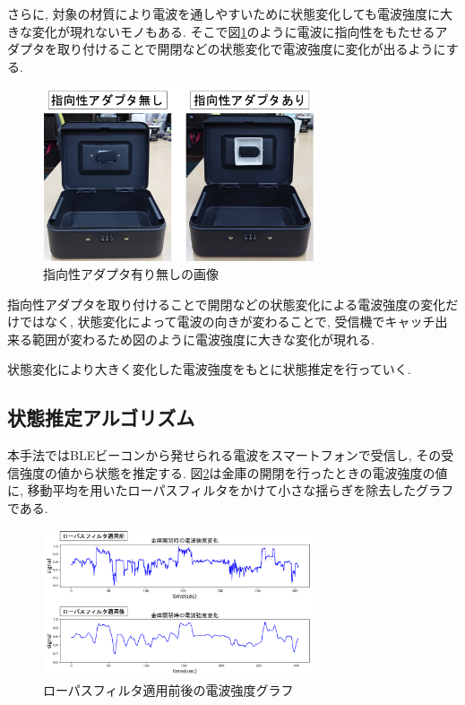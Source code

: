 \documentclass[Japanese]{dicomopapers}
\begin{document}
さらに, 対象の材質により電波を通しやすいために状態変化しても電波強度に大きな変化が現れないモノもある.
そこで図\ref{adapter}のように電波に指向性をもたせるアダプタを取り付けることで開閉などの状態変化で電波強度に変化が出るようにする.


\begin{figure}[ht]
 \centering
 \includegraphics[width=8cm]{adapta_compare.png}
 \caption{指向性アダプタ有り無しの画像}
 \label{adapter}
\end{figure}

指向性アダプタを取り付けることで開閉などの状態変化による電波強度の変化だけではなく, 状態変化によって電波の向きが変わることで, 受信機でキャッチ出来る範囲が変わるため図のように電波強度に大きな変化が現れる.

状態変化により大きく変化した電波強度をもとに状態推定を行っていく.

\subsection{状態推定アルゴリズム}
本手法ではBLEビーコンから発せられる電波をスマートフォンで受信し, その受信強度の値から状態を推定する.
図\ref{bank-opcl}は金庫の開閉を行ったときの電波強度の値に, 移動平均を用いたローパスフィルタをかけて小さな揺らぎを除去したグラフである.

\begin{figure}[t]
 \centering
 \includegraphics[width=8cm]{lowpath_compare.png}
 \caption{ローパスフィルタ適用前後の電波強度グラフ}
 \label{bank-opcl}
\end{figure}
\end{document}
